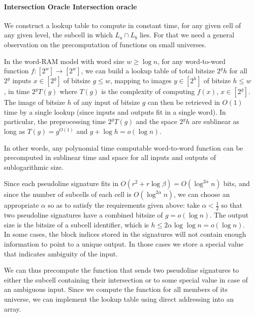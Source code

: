 \paragraph*{\iftitlecase%
Intersection Oracle\else%
Intersection oracle\fi}
We construct a lookup table to compute in constant time,
for any given cell of any given level, the subcell in which \(L_a \cap L_b\)
lies.
For that we need a general observation on the precomputation of functions on
small universes.
%
\begin{observation}\label{obs:small-universe-functions}
  In the word-RAM model with word size \(w \geq \log n\), for any word-to-word
  function \(f:[2^w] \to [2^w]\), we can build a lookup table of total bitsize
  \(2^g h\) for all \(2^g\) inputs \(x \in [2^g]\) of bitsize \(g \leq w\),
  mapping to images \(y \in [2^h]\) of bitsize \(h \leq w\),
  in time \(2^g T(g)\) where \(T(g)\) is the complexity of computing \(f(x)\), 
  \(x \in [2^g]\). The image of bitsize \(h\) of any input of bitsize \(g\) can then be
  retrieved in \(O(1)\) time by a single lookup (since inputs and outputs fit in
  a single word). In particular, the preprocessing time \(2^g T(g)\) and the
  space \(2^g h\) are sublinear as long as \(T(g)=g^{O(1)}\) and \(g + \log h
  = o(\log n)\).
\end{observation}
%
In other words, any polynomial time computable word-to-word function can be
precomputed in sublinear time and space for all inputs and outputs of
sublogarithmic size.
%

Since each pseudoline signature fits in
\(O(r^2 + r \log \beta) = O(\log^{2\alpha}{n})\)
bits,
and since the number of subcells of each cell is \(O(\log^{2\alpha}{n})\),
we can choose an appropriate \(\alpha\) so as to satisfy the requirements given
above:
take \(\alpha < \frac 12\) so that two pseudoline signatures
have a combined bitsize of \(g = o(\log n)\).
The output size is the bitsize of a subcell identifier, which is \(h \leq 2
\alpha \log \log n = o(\log n)\).
%
In some cases, the block indices stored in the signatures will not contain
enough information to point to a unique output. In those cases we store a
special value that indicates ambiguity of the input.

We can thus precompute the function that sends two pseudoline
signatures to either the subcell containing their intersection or to some
special value in case of an ambiguous input. Since we compute the function for
all members of its universe, we can implement the lookup table using
direct addressing into an array.

